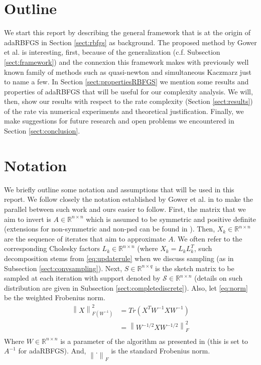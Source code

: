 \documentclass[12pt,conference,compsocconf]{IEEEtran}
\newcommand\norm[1]{\left\lVert#1\right\rVert}
\newcommand{\R}{\mathbb{R}}
\begin{document}
\section{Outline}
We start this report by describing the general framework that is at the origin of adaRBFGS in Section \ref{sect:rbfgs} as background. The proposed method by Gower et al. is interesting, first, because of the generalization (c.f. Subsection \ref{sect:framework}) and the connexion this framework makes with previously well known family of methods such as quasi-newton and simultaneous Kaczmarz just to name a few. In Section \ref{sect:propertiesRBFGS} we mention some results and properties of adaRBFGS that will be useful for our complexity analysis. We will, then, show our results with respect to the rate complexity (Section \ref{sect:results}) of the rate via numerical experiments and theoretical justification. Finally, we make suggestions for future research and open problems we encountered in Section \ref{sect:conclusion}.


\section{Notation}\label{sect:notation}
We briefly outline some notation and assumptions that will be used in this report. We follow closely the notation established by Gower et al. in \cite{Gower1} to make the parallel between such work and ours easier to follow. First, the matrix that we aim to invert is $A \in \R^{n\times n}$ which is assumed to be symmetric and positive definite (extensions for non-symmetric and non-psd can be found in \cite{Gower1,Gower4}). Then, $X_k \in \R^{n\times n}$ are the sequence of iterates that aim to approximate $A$. We often refer to the corresponding Cholesky factors $L_k \in \R^{n\times n}$ (where $X_k=L_kL_k^T$, such decomposition stems from \eqref{eq:updaterule} when we discuss sampling (as in Subsection \ref{sect:convsampling}). Next, $S \in \R^{n\times q}$ is the sketch matrix to be sampled at each iteration with support denoted by $\mathcal{S} \in \R^{n \times n}$ (details on such distribution are given in Subsection \ref{sect:completediscrete}). Also, let \eqref{eq:norm} be the weighted Frobenius norm.
\begin{align} \label{eq:norm}
	\norm{X}_{F(W^{-1})}^2 &=Tr(X^TW^{-1}XW^{-1})\\ \nonumber
    &=\norm{W^{-1/2}XW^{-1/2}}_F^2\\ \nonumber
\end{align}
Where $W \in \R^{n \times n}$ is a parameter of the algorithm as presented in \cite{Gower1} (this is set to $A^{-1}$ for adaRBFGS). And, $\norm{.}_F$ is the standard Frobenius norm.
\end{document}

